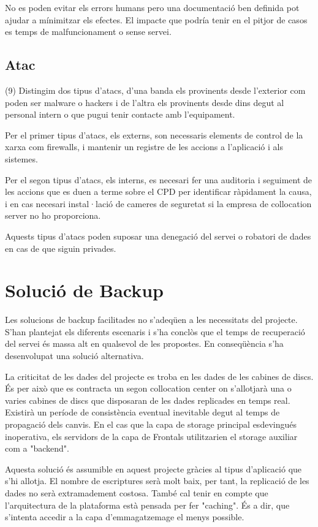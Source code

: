 \documentclass[a4paper, 11pt]{article}
\begin{document}
No es poden evitar els errors humans pero una documentació ben definida pot ajudar a mínimitzar els efectes. El impacte que podría tenir en el pitjor de casos es temps de malfuncionament o sense servei. 

\subsection{Atac}
(9) Distingim dos tipus d'atacs, d'una banda els provinents desde l'exterior com poden ser malware o hackers i de l'altra els provinents desde dins degut al personal intern o que pugui tenir contacte amb l'equipament. 

Per el primer tipus d'atacs, els externs, son necessaris elements de control de la xarxa com firewalls, i mantenir un registre de les accions a l'aplicació i als sistemes. 

Per el segon tipus d'atacs, els interns, es necesari fer una auditoria i seguiment de les accions que es duen a terme sobre el CPD per identificar ràpidament la causa, i en cas necesari instal·lació de cameres de seguretat si la empresa de collocation server no ho proporciona.

Aquests tipus d'atacs poden suposar una denegació del servei o robatori de dades en cas de que siguin privades.


\section{Solució de Backup}

Les solucions de backup facilitades no s'adeqüen a les necessitats del projecte. S'han plantejat els diferents escenaris i s'ha conclòs que el temps de recuperació del servei és massa alt en qualsevol de les propostes. En conseqüència s'ha desenvolupat una solució alternativa. 

La criticitat de les dades del projecte es troba en les dades de les cabines de discs. És per això que es contracta un segon collocation center on s'allotjarà una o varies cabines de discs que disposaran de les dades replicades en temps real. Existirà un període de consistència eventual inevitable degut al temps de propagació dels canvis. En el cas que la capa de storage principal esdevingués inoperativa, els servidors de la capa de Frontals utilitzarien el storage auxiliar com a "backend". 

Aquesta solució és assumible en aquest projecte gràcies al tipus d'aplicació que s'hi allotja. El nombre de escriptures serà molt baix, per tant, la replicació de les dades no serà extramadement costosa. També cal tenir en compte que l'arquitectura de la plataforma està pensada per fer "caching". És a dir, que s'intenta accedir a la capa d'emmagatzemage el menys possible. 
\end{document}

